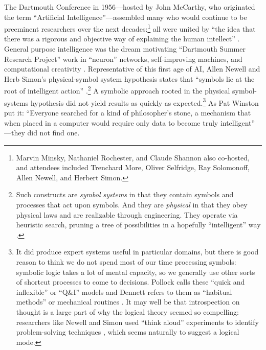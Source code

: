 The Dartmouth
Conference in 1956---hosted by John McCarthy, who originated
  the term ``Artificial Intelligence''---assembled many who would continue to
be preeminent researchers over the next decades:\footnote{Marvin Minsky, Nathaniel Rochester, and
Claude Shannon also co-hosted, and attendees included Trenchard More, Oliver Selfridge,
Ray Solomonoff, Allen Newell, and Herbert Simon.} all were united by
``the idea that there was a rigorous and objective way of explaining
the human intellect'' \cite[Ch. 5]{mccorduck}. General purpose
intelligence was the dream motivating ``Dartmouth Summer Research
Project'' work in ``neuron'' networks,
self-improving machines, and computational creativity
\cite{dartmouthconf}. Representative of this first age of AI, Allen Newell and Herb Simon's
physical-symbol system hypothesis states that ``symbols lie at the root of 
intelligent action'' \cite[p. 109]{newellsimon}.\footnote{Such
constructs are \emph{symbol systems} in that they contain symbols and processes
that act upon symbols. And they are \emph{physical} in that they obey
physical laws and are realizable through engineering. They operate via
heuristic search, pruning a tree of possibilities in a hopefully
``intelligent'' way \cite[p. 124]{newellsimon}.} A symbolic
approach rooted in the physical symbol-systems hypothesis did not
yield results as quickly as expected.\footnote{It did produce
  expert systems useful in particular domains, but there is good
  reason to think we do not spend most of our time processing symbols:
  symbolic logic takes a lot of mental capacity, so we generally use
  other sorts of shortcut processes to come to decisions. Pollock
  calls these ``quick and inflexible'' or ``Q\&I'' models \cite[p.
    120]{pollock} and Dennett refers to them as ``habitual methods''
  or mechanical routines \cite[p. 157]{dennett}.
It may well be that introspection on thought is a large part of why the logical theory seemed so
compelling: researchers like Newell and Simon used ``think aloud''
experiments to identify problem-solving techniques \cite[Ch.
  10]{mccorduck}, which seems naturally to suggest a logical mode.} As
Pat Winston put it: ``Everyone searched for a kind of philosopher's
stone, 
a mechanism that when placed in a computer would require only data to
become truly intelligent'' \cite[p. 4]{winston}---they did not find one.

